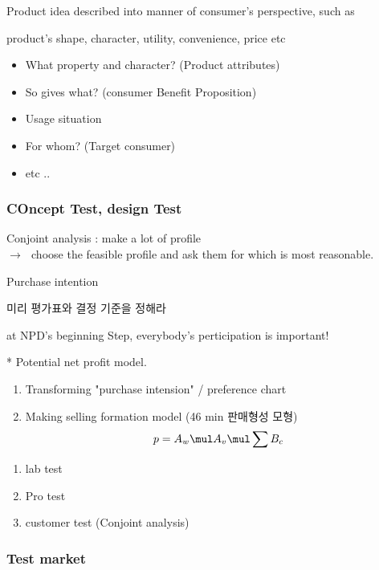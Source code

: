 \documentclass[12pt]{article}
\newcommand{\ra}{$\rightarrow \text{ }$}
\begin{document}
\begin{tcolorbox}
	Product idea described into manner of consumer's perspective, such as

	product's shape, character, utility, convenience, price etc

\end{tcolorbox}

\begin{itemize}
	\item What property and character? (Product attributes)
	\item So gives what? (consumer Benefit Proposition)
	\item  Usage situation
	\item For whom? (Target consumer)
	\item etc ..
\end{itemize}

\subsubsection{COncept Test, design Test}

Conjoint analysis : make a lot of profile \\
\ra choose the feasible profile and ask them for which is most reasonable.

Purchase intention

미리 평가표와 결정 기준을 정해라

at NPD's beginning Step, everybody's perticipation is important!



 * Potential net profit model.

\begin{enumerate}
	\item Transforming "purchase intension" / preference chart
	\item Making selling formation model (46 min 판매형성 모형)
	\[
	 p = A_w \mul A_v \mul \sum B_c
	\]
\end{enumerate}
\begin{enumerate}
	\item lab test
	\item Pro test
	\item customer test (Conjoint analysis)
\end{enumerate}

\subsubsection{Test market}
\end{document}
